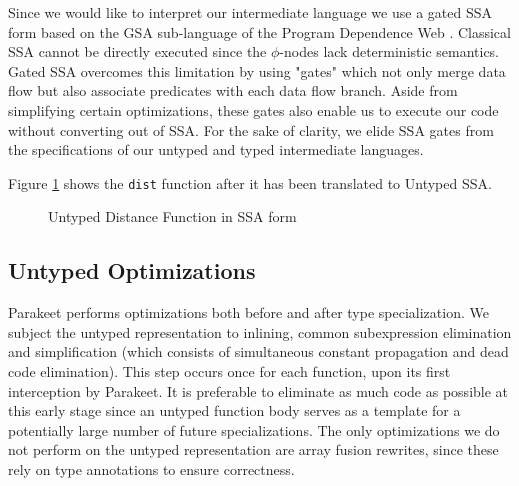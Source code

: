\documentclass[preprint]{sigplanconf}
\begin{document}
Since we would like to interpret our intermediate language we use a gated SSA form based on the GSA sub-language of the Program Dependence Web \cite{Ott90}. Classical SSA cannot be directly executed since the $\phi$-nodes lack deterministic semantics. Gated SSA overcomes this limitation by using "gates" which not only merge data flow but also associate predicates with each data flow branch. Aside from simplifying certain optimizations, these gates also enable us to execute our code without converting out of SSA.  For the sake of clarity, we elide SSA gates from the specifications of our untyped and typed intermediate languages. 

Figure \ref{UntypedSSADist} shows the \texttt{dist} function after it has been translated to Untyped SSA.

\begin{figure}[h!]
\caption{Untyped Distance Function in SSA form}
\label{UntypedSSADist}
\end{figure}

\subsection{Untyped Optimizations}
Parakeet performs optimizations both before and after type specialization. We subject the untyped representation to inlining, common subexpression elimination and simplification (which consists of simultaneous constant propagation and dead code elimination). This step occurs once for each function, upon its first interception by Parakeet. It is preferable to eliminate as much code as possible at this early stage since an untyped function body serves as a template for a potentially large number of future specializations. The only optimizations we do not perform on the untyped representation are array fusion rewrites, since these rely on type annotations to ensure correctness.
\end{document}
